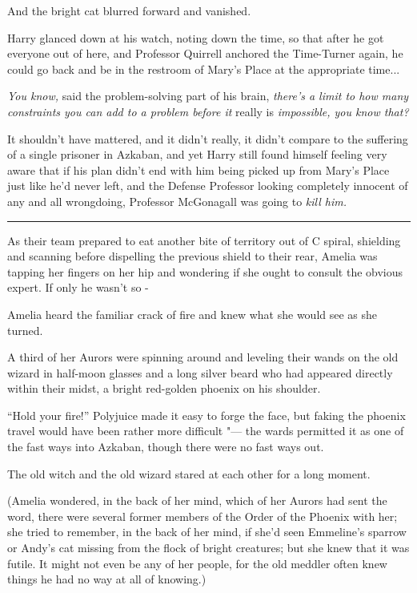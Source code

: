 And the bright cat blurred forward and vanished.

Harry glanced down at his watch, noting down the time, so that after he
got everyone out of here, and Professor Quirrell anchored the
Time-Turner again, he could go back and be in the restroom of Mary's
Place at the appropriate time...

\emph{You know,} said the problem-solving part of his brain,
\emph{there's a limit to how many constraints you can add to a problem
before it} really is \emph{impossible, you know that?}

It shouldn't have mattered, and it didn't really, it didn't compare to
the suffering of a single prisoner in Azkaban, and yet Harry still found
himself feeling very aware that if his plan didn't end with him being
picked up from Mary's Place just like he'd never left, and the Defense
Professor looking completely innocent of any and all wrongdoing,
Professor McGonagall was going to \emph{kill him.}

\begin{center}\rule{3in}{0.4pt}\end{center}

As their team prepared to eat another bite of territory out of C spiral,
shielding and scanning before dispelling the previous shield to their
rear, Amelia was tapping her fingers on her hip and wondering if she
ought to consult the obvious expert. If only he wasn't so -

Amelia heard the familiar crack of fire and knew what she would see as
she turned.

A third of her Aurors were spinning around and leveling their wands on
the old wizard in half-moon glasses and a long silver beard who had
appeared directly within their midst, a bright red-golden phoenix on his
shoulder.

``Hold your fire!'' Polyjuice made it easy to forge the face, but faking
the phoenix travel would have been rather more difficult "--- the wards
permitted it as one of the fast ways into Azkaban, though there were no
fast ways out.

The old witch and the old wizard stared at each other for a long moment.

(Amelia wondered, in the back of her mind, which of her Aurors had sent
the word, there were several former members of the Order of the Phoenix
with her; she tried to remember, in the back of her mind, if she'd seen
Emmeline's sparrow or Andy's cat missing from the flock of bright
creatures; but she knew that it was futile. It might not even be any of
her people, for the old meddler often knew things he had no way at all
of knowing.)

